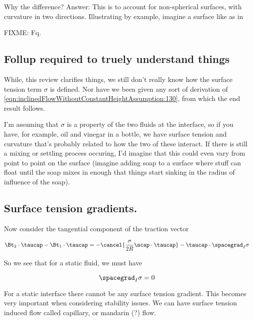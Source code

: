 Why the difference?  Answer: This is to account for non-spherical surfaces, with curvature in two directions.  Illustrating by example, imagine a surface like as in

FIXME: Fq.

\subsection{Follup required to truely understand things}

While, this review clarifies things, we still don't really know how the surface tension term $\sigma$ is defined.  Nor have we been given any sort of derivation of \ref{eqn:inclinedFlowWithoutConstantHeightAssumption:130}, from which the end result follows.

I'm assuming that $\sigma$ is a property of the two fluids at the interface, so if you have, for example, oil and vinegar in a bottle, we have surface tension and curvature that's probably related to how the two of these interact.  If there is still a mixing or settling process occuring, I'd imagine that this could even vary from point to point on the surface (imagine adding soap to a surface where stuff can float until the soap mixes in enough that things start sinking in the radius of influence of the soap).

\subsection{Surface tension gradients.}

Now consider the tangential component of the traction vector

\begin{equation}\label{eqn:inclinedFlowWithoutConstantHeightAssumption:90}
\Bt_2 \cdot \taucap - \Bt_1 \cdot \taucap = - \cancel{ \frac{\sigma}{2 R} \ncap \cdot \taucap} - \taucap \cdot \spacegrad_I \sigma
\end{equation}

So we see that for a static fluid, we must have

\begin{equation}\label{eqn:inclinedFlowWithoutConstantHeightAssumption:110}
\spacegrad_I \sigma = 0
\end{equation}

For a static interface there cannot be any surface tension gradient.  This becomes very important when considering stability issues.  We can have surface tension induced flow called capillary, or mandarin (?) flow.

